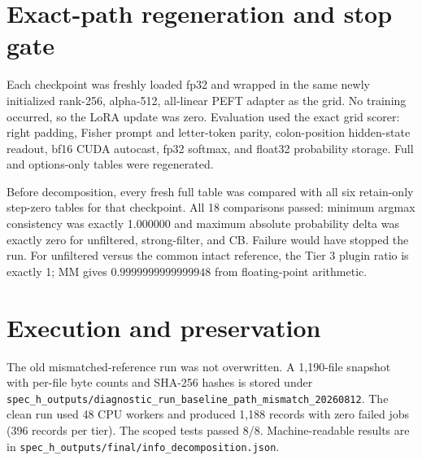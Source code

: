 \documentclass[11pt]{article}
\begin{document}
\section{Exact-path regeneration and stop gate}
Each checkpoint was freshly loaded fp32 and wrapped in the same newly
initialized rank-256, alpha-512, all-linear PEFT adapter as the grid.  No
training occurred, so the LoRA update was zero.  Evaluation used the exact
grid scorer: right padding, Fisher prompt and letter-token parity,
colon-position hidden-state readout, bf16 CUDA autocast, fp32 softmax, and
float32 probability storage.  Full and options-only tables were regenerated.

Before decomposition, every fresh full table was compared with all six
retain-only step-zero tables for that checkpoint.  All 18 comparisons passed:
minimum argmax consistency was exactly 1.000000 and maximum absolute
probability delta was exactly zero for unfiltered, strong-filter, and CB.
Failure would have stopped the run.  For unfiltered versus the common intact
reference, the Tier 3 plugin ratio is exactly 1; MM gives
$0.9999999999999948$ from floating-point arithmetic.

\section{Execution and preservation}
The old mismatched-reference run was not overwritten.  A 1,190-file snapshot
with per-file byte counts and SHA-256 hashes is stored under
\texttt{spec\_h\_outputs/diagnostic\_run\_baseline\_path\_mismatch\_20260812}.
The clean run used 48 CPU workers and produced 1,188 records with zero failed
jobs (396 records per tier).  The scoped tests passed 8/8.  Machine-readable
results are in \texttt{spec\_h\_outputs/final/info\_decomposition.json}.
\end{document}
